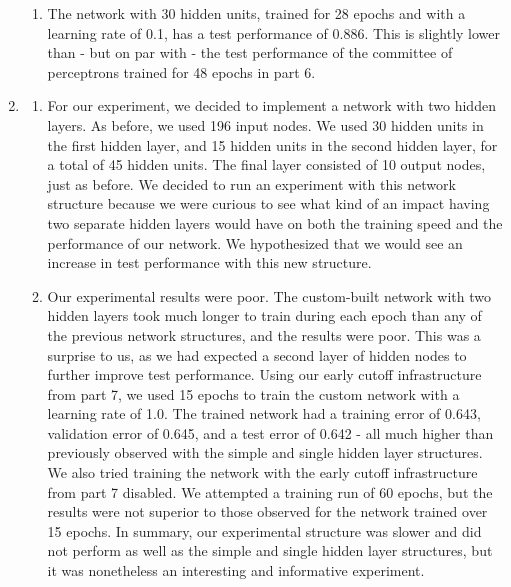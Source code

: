 \documentclass[solution, letterpaper]{cs121}
\begin{document}
\begin{enumerate}
\begin{enumerate}
			\item The network with 30 hidden units, trained for 28 epochs and with a learning rate of 0.1, has a test performance of 0.886. This is slightly lower than - but on par with - the test performance of the committee of perceptrons trained for 48 epochs in part 6.
		\end{enumerate}
	\item
		\begin{enumerate}
			\item For our experiment, we decided to implement a network with two hidden layers. As before, we used 196 input nodes. We used 30 hidden units in the first hidden layer, and 15 hidden units in the second hidden layer, for a total of 45 hidden units. The final layer consisted of 10 output nodes, just as before. We decided to run an experiment with this network structure because we were curious to see what kind of an impact having two separate hidden layers would have on both the training speed and the performance of our network. We hypothesized that we would see an increase in test performance with this new structure.
			\item Our experimental results were poor. The custom-built network with two hidden layers took much longer to train during each epoch than any of the previous network structures, and the results were poor. This was a surprise to us, as we had expected a second layer of hidden nodes to further improve test performance. Using our early cutoff infrastructure from part 7, we used 15 epochs to train the custom network with a learning rate of 1.0. The trained network had a training error of 0.643, validation error of 0.645, and a test error of 0.642 - all much higher than previously observed with the simple and single hidden layer structures. We also tried training the network with the early cutoff infrastructure from part 7 disabled. We attempted a training run of 60 epochs, but the results were not superior to those observed for the network trained over 15 epochs. In summary, our experimental structure was slower and did not perform as well as the simple and single hidden layer structures, but it was nonetheless an interesting and informative experiment.
		\end{enumerate}
\end{enumerate}
\end{document}
